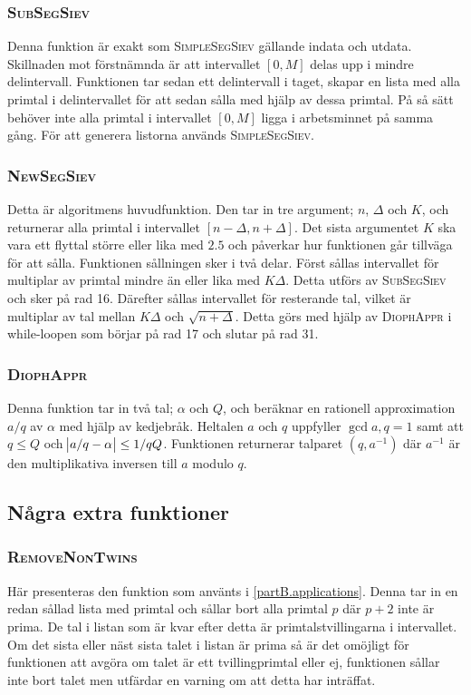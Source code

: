 \subsubsection*{\textsc{SubSegSiev}}
Denna funktion är exakt som \textsc{SimpleSegSiev} gällande indata och utdata.
Skillnaden mot förstnämnda är att intervallet $[0,M]$ delas upp i mindre delintervall.
Funktionen tar sedan ett delintervall i taget, skapar en lista med alla primtal i delintervallet för att sedan sålla med hjälp av dessa primtal. 
På så sätt behöver inte alla primtal i intervallet $[0,M]$ ligga i arbetsminnet på samma gång.
För att generera listorna används \textsc{SimpleSegSiev}.


\subsubsection*{\textsc{NewSegSiev}}
Detta är algoritmens huvudfunktion. Den tar in tre argument; $n$, $\Delta$ och $K$, och returnerar alla primtal i intervallet $[n-\Delta,n+\Delta]$. Det sista argumentet $K$ ska vara ett flyttal större eller lika med $2.5$ och påverkar hur funktionen går tillväga för att sålla. Funktionen sållningen sker i två delar. Först sållas intervallet för multiplar av primtal mindre än eller lika med $K\Delta$. Detta utförs av \textsc{SubSegSiev} och sker på rad 16. Därefter sållas intervallet för resterande tal, vilket är multiplar av tal mellan $K\Delta$ och $\sqrt{n+\Delta}$. Detta görs med hjälp av \textsc{DiophAppr} i while-loopen som börjar på rad 17 och slutar på rad 31.

\subsubsection*{\textsc{DiophAppr}}
Denna funktion tar in två tal; $\alpha$ och $Q$, och beräknar en rationell approximation $a/q$ av $\alpha$ med hjälp av kedjebråk.
Heltalen $a$ och $q$ uppfyller $\gcd{a,q}=1$ samt att $q\leq Q$ och $\abs{a/q-\alpha}\leq 1/qQ$.
Funktionen returnerar talparet $(q, a^{-1})$ där $a^{-1}$ är den multiplikativa inversen till $a$ modulo $q$.


\subsection{Några extra funktioner}
\subsubsection*{\textsc{RemoveNonTwins}}
Här presenteras den funktion som använts i \ref{partB.applications}.
Denna tar in en redan sållad lista med primtal och sållar bort alla primtal $p$ där $p+2$ inte är prima.
De tal i listan som är kvar efter detta är primtalstvillingarna i intervallet.
Om det sista eller näst sista talet i listan är prima så är det omöjligt för funktionen att avgöra om talet är ett tvillingprimtal eller ej, funktionen sållar inte bort talet men utfärdar en varning om att detta har inträffat.
\label{code.twins}

